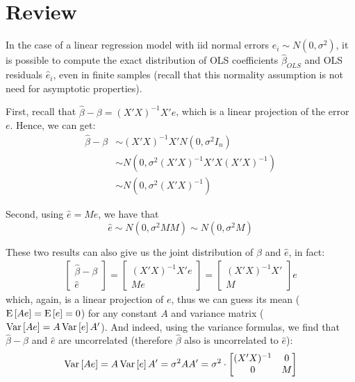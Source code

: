 \section{Review}

In the case of a linear regression model with iid normal errors $e_i \sim N(0,\sigma^2)$, it is possible to compute the exact distribution of OLS coefficients $\hat\beta_{OLS}$ and OLS residuals $\hat e_i$, even in finite samples (recall that this normality assumption is not need for asymptotic properties).

First, recall that $\hat{\beta} - \beta = (X'X)^{-1}X'e$, which is a linear projection of the error $e$. Hence, we can get:\begin{align*}
\hat\beta - \beta & \sim (X'X)^{-1}X'N(0,\sigma^2 I_n)\\
& \sim N(0, \sigma^2 (X'X)^{-1}X'X(X'X)^{-1}) \\ & \sim N(0,\sigma^2(X'X)^{-1})
\end{align*}

Second, using $\hat e = Me$, we have that $$\hat e \sim N(0, \sigma^2 MM) \sim N(0, \sigma^2 M) $$

These two results can also give us the joint distribution of $\hat \beta$ and $\hat e$, in fact:\begin{align*}
\begin{bmatrix}
    \hat\beta - \beta \\
    \hat e
\end{bmatrix}
= \begin{bmatrix}
    (X'X)^{-1}X'e \\
    Me
\end{bmatrix}
= \begin{bmatrix}
    (X'X)^{-1}X' \\
    M
\end{bmatrix}
e
\end{align*} which, again, is a linear projection of $e$, thus we can guess its mean ($\operatorname{E}\left[Ae\right] = \operatorname{E}\left[e\right] = 0$) for any constant $A$ and variance matrix ($\operatorname{Var}\left[Ae\right] = A\operatorname{Var}\left[e\right]A'$). And indeed, using the variance formulas, we find that $\hat\beta - \beta$ and $\hat e$ are uncorrelated (therefore $\hat\beta$ also is uncorrelated to $\hat e$):\begin{align*}
\operatorname{Var}\left[Ae\right] = A\operatorname{Var}\left[e\right]A' = \sigma^2 AA' = \sigma^2 \cdot \begin{bmatrix}
(X'X)^{-1} & 0 \\
0 & M
\end{bmatrix}
\end{align*}


